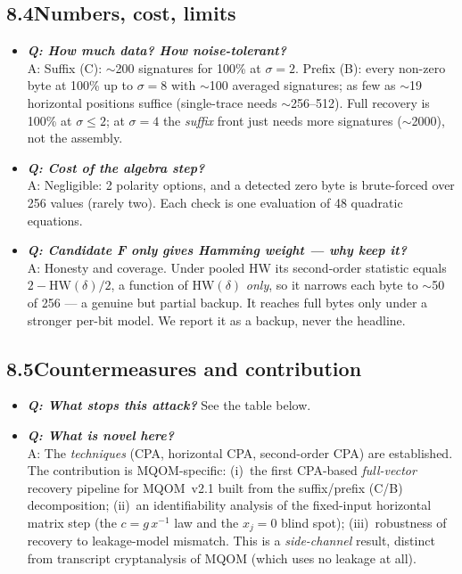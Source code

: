 \documentclass[11pt]{article}
\newcommand{\hw}{\mathrm{HW}}
\begin{document}
\subsection*{8.4\quad Numbers, cost, limits}
\begin{itemize}
\item \textbf{\textit{Q: How much data? How noise-tolerant?}}\\
A: Suffix (C): $\sim$200 signatures for 100\% at $\sigma=2$. Prefix (B): every non-zero byte at
100\% up to $\sigma=8$ with $\sim$100 averaged signatures; as few as $\sim$19 horizontal
positions suffice (single-trace needs $\sim$256--512). Full recovery is 100\% at $\sigma\le 2$;
at $\sigma=4$ the \emph{suffix} front just needs more signatures ($\sim$2000), not the assembly.
\item \textbf{\textit{Q: Cost of the algebra step?}}\\
A: Negligible: 2 polarity options, and a detected zero byte is brute-forced over 256 values
(rarely two). Each check is one evaluation of 48 quadratic equations.
\item \textbf{\textit{Q: Candidate F only gives Hamming weight --- why keep it?}}\\
A: Honesty and coverage. Under pooled HW its second-order statistic equals
$2-\hw(\delta)/2$, a function of $\hw(\delta)$ \emph{only}, so it narrows each byte to $\sim$50
of 256 --- a genuine but partial backup. It reaches full bytes only under a stronger per-bit
model. We report it as a backup, never the headline.
\end{itemize}

\subsection*{8.5\quad Countermeasures and contribution}
\begin{itemize}
\item \textbf{\textit{Q: What stops this attack?}} See the table below.
\item \textbf{\textit{Q: What is novel here?}}\\
A: The \emph{techniques} (CPA, horizontal CPA, second-order CPA) are established. The
contribution is MQOM-specific: (i)~the first CPA-based \emph{full-vector} recovery pipeline for
MQOM~v2.1 built from the suffix/prefix (C/B) decomposition; (ii)~an identifiability analysis of
the fixed-input horizontal matrix step (the $c=g\,x^{-1}$ law and the $x_j{=}0$ blind spot);
(iii)~robustness of recovery to leakage-model mismatch. This is a \emph{side-channel} result,
distinct from transcript cryptanalysis of MQOM (which uses no leakage at all).
\end{itemize}
\end{document}
